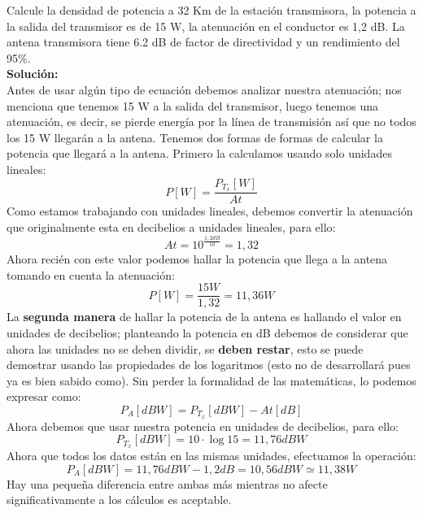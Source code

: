 \documentclass[
	12pt, %
	fleqn, %
	a4paper, %
	oneside, %
]{LegrandOrangeBook}
\begin{document}
\begin{example}
Calcule la densidad de potencia a 32 Km de la estación transmisora, la potencia a la salida del transmisor es de 15 W, la atenuación en el conductor es 1,2 dB. La antena transmisora tiene 6.2 dB de factor de directividad y un rendimiento del 95\%.\\
\textbf{Solución:}\\
Antes de usar algún tipo de ecuación debemos analizar nuestra atenuación; nos menciona que tenemos 15 W a la salida del transmisor, luego tenemos una atenuación, es decir, se pierde energía por la línea de transmisión así que no todos los 15 W llegarán a la antena. Tenemos dos formas de formas de calcular la potencia que llegará a la antena. Primero la calculamos usando solo unidades lineales:
\begin{displaymath}
P[W]=\frac{P_{T_x}[W]}{At}
\end{displaymath}
Como estamos trabajando con unidades lineales, debemos convertir la atenuación que originalmente esta en decibelios a unidades lineales, para ello:
\begin{displaymath}
At=10^{\frac{1,2 dB}{10}}=1,32
\end{displaymath}
Ahora recién con este valor podemos hallar la potencia que llega a la antena tomando en cuenta la atenuación:
\begin{displaymath}
P[W]=\frac{15 W}{1,32}=11,36 W
\end{displaymath}
La \textbf{segunda manera} de hallar la potencia de la antena es hallando  el valor en unidades de decibelios; planteando la potencia en dB debemos de considerar que ahora las unidades no se deben dividir, se \textbf{deben restar}, esto se puede demostrar usando las propiedades de los logaritmos (esto no de desarrollará pues ya es bien sabido como). Sin perder la formalidad de las matemáticas, lo podemos expresar como:
\begin{displaymath}
P_A[dBW]=P_{T_x}[dBW]-  At[dB]
\end{displaymath}
Ahora debemos que usar nuestra potencia en unidades de decibelios, para ello:
\begin{displaymath}
P_{T_x}[dBW]=10\cdot\log 15=11,76 dBW
\end{displaymath}
Ahora que todos los datos están en las mismas unidades, efectuamos la operación:
\begin{displaymath}
P_A[dBW]=11,76 dBW - 1,2 dB=10,56 dBW\simeq 11,38 W
\end{displaymath}
Hay una pequeña diferencia entre ambas más mientras no afecte significativamente a los cálculos es aceptable.\\

\end{example}
\end{document}
